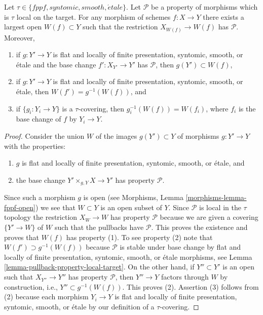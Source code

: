\begin{lemma}
\label{lemma-largest-open-of-the-base}
Let $\tau \in \{fppf, syntomic, smooth, \acute{e}tale\}$.
Let $\mathcal{P}$ be a property of morphisms which is $\tau$ local
on the target. For any morphism of schemes $f : X \to Y$ there exists
a largest open $W(f) \subset Y$ such that the restriction
$X_{W(f)} \to W(f)$ has $\mathcal{P}$. Moreover,
\begin{enumerate}
\item if $g : Y' \to Y$ is flat and locally of finite presentation,
syntomic, smooth, or \'etale and the base change $f' : X_{Y'} \to Y'$
has $\mathcal{P}$, then $g(Y') \subset W(f)$,
\item if $g : Y' \to Y$ is flat and locally of finite presentation,
syntomic, smooth, or \'etale, then $W(f') = g^{-1}(W(f))$, and
\item if $\{g_i : Y_i \to Y\}$ is a $\tau$-covering, then
$g_i^{-1}(W(f)) = W(f_i)$, where $f_i$ is the base change of $f$
by $Y_i \to Y$.
\end{enumerate}
\end{lemma}

\begin{proof}
Consider the union $W$ of the images $g(Y') \subset Y$ of
morphisms $g : Y' \to Y$ with the properties:
\begin{enumerate}
\item $g$ is flat and locally of finite presentation, syntomic,
smooth, or \'etale, and
\item the base change $Y' \times_{g, Y} X \to Y'$ has property
$\mathcal{P}$.
\end{enumerate}
Since such a morphism $g$ is open (see
Morphisms, Lemma \ref{morphisms-lemma-fppf-open})
we see that $W \subset Y$ is an open subset of $Y$. Since $\mathcal{P}$
is local in the $\tau$ topology the restriction $X_W \to W$ has property
$\mathcal{P}$ because we are given a covering $\{Y' \to W\}$ of $W$ such that
the pullbacks have $\mathcal{P}$. This proves the existence and proves
that $W(f)$ has property (1). To see property (2) note that
$W(f') \supset g^{-1}(W(f))$ because $\mathcal{P}$ is stable under
base change by flat and locally of finite presentation,
syntomic, smooth, or \'etale morphisms, see
Lemma \ref{lemma-pullback-property-local-target}.
On the other hand, if $Y'' \subset Y'$ is an open such that
$X_{Y''} \to Y''$ has property $\mathcal{P}$, then $Y'' \to Y$ factors
through $W$ by construction, i.e., $Y'' \subset g^{-1}(W(f))$. This
proves (2). Assertion (3) follows from (2) because each morphism
$Y_i \to Y$ is flat and locally of finite presentation, syntomic,
smooth, or \'etale by our definition of a $\tau$-covering.
\end{proof}

